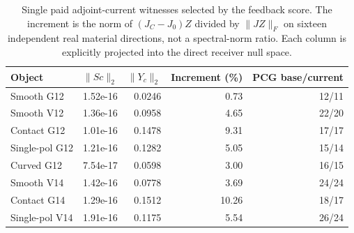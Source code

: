 \begin{table}[htbp]\centering\small
\caption{Single paid adjoint-current witnesses selected by the feedback score. The increment is the norm of $(J_C-J_0)Z$ divided by $\|JZ\|_F$ on sixteen independent real material directions, not a spectral-norm ratio. Each column is explicitly projected into the direct receiver null space.}
\begin{tabular}{lrrrr}\toprule
Object & $\|Sc\|_2$ & $\|Y_c\|_2$ & Increment (\%) & PCG base/current\\\midrule
Smooth G12 & 1.52e-16 & 0.0246 & 0.73 & 12/11\\
Smooth V12 & 1.36e-16 & 0.0958 & 4.65 & 22/20\\
Contact G12 & 1.01e-16 & 0.1478 & 9.31 & 17/17\\
Single-pol G12 & 1.21e-16 & 0.1282 & 5.05 & 15/14\\
Curved G12 & 7.54e-17 & 0.0598 & 3.00 & 16/15\\
Smooth V14 & 1.42e-16 & 0.0778 & 3.69 & 24/24\\
Contact G14 & 1.29e-16 & 0.1512 & 10.26 & 18/17\\
Single-pol V14 & 1.91e-16 & 0.1175 & 5.54 & 26/24\\
\bottomrule\end{tabular}\end{table}
